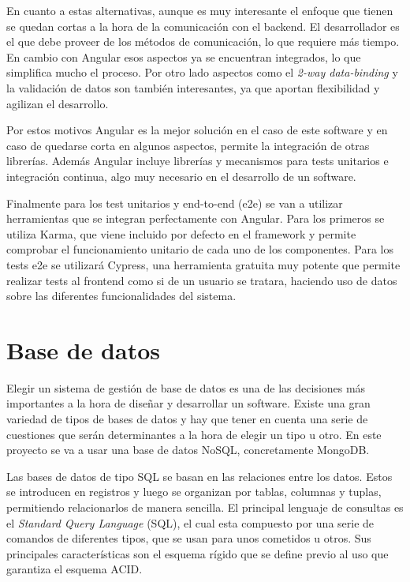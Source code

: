 En cuanto a estas alternativas, aunque es muy interesante el enfoque que tienen se quedan cortas a la hora de la comunicación con el backend. El desarrollador es el que debe proveer de los métodos de comunicación, lo que requiere más tiempo. En cambio con Angular esos aspectos ya se encuentran integrados, lo que simplifica mucho el proceso. Por otro lado aspectos como el \textit{2-way data-binding} y la validación de datos son también interesantes, ya que aportan flexibilidad y agilizan el desarrollo.

Por estos motivos Angular es la mejor solución en el caso de este software y en caso de quedarse corta en algunos aspectos, permite la integración de otras librerías. Además Angular incluye librerías y mecanismos para tests unitarios e integración continua, algo muy necesario en el desarrollo de un software.

Finalmente para los test unitarios y end-to-end (e2e) se van a utilizar herramientas que se integran perfectamente con Angular. Para los primeros se utiliza Karma, que viene incluido por defecto en el framework y permite comprobar el funcionamiento unitario de cada uno de los componentes. Para los tests e2e se utilizará Cypress, una herramienta gratuita muy potente que permite realizar tests al frontend como si de un usuario se tratara, haciendo uso de datos sobre las diferentes funcionalidades del sistema.






\section{Base de datos}


Elegir un sistema de gestión de base de datos es una de las decisiones más importantes a la hora de diseñar y desarrollar un software. Existe una gran variedad de tipos de bases de datos y hay que tener en cuenta una serie de cuestiones que serán determinantes a la hora de elegir un tipo u otro. En este proyecto se va a usar una base de datos NoSQL, concretamente MongoDB.

Las bases de datos de tipo SQL se basan en las relaciones entre los datos. Estos se introducen en registros y luego se organizan por tablas, columnas y tuplas, permitiendo relacionarlos de manera sencilla. El principal lenguaje de consultas es el \textit{Standard Query Language} (SQL), el cual esta compuesto por una serie de comandos de diferentes tipos, que se usan para unos cometidos u otros. Sus principales características son el esquema rígido que se define previo al uso que garantiza el esquema ACID.

